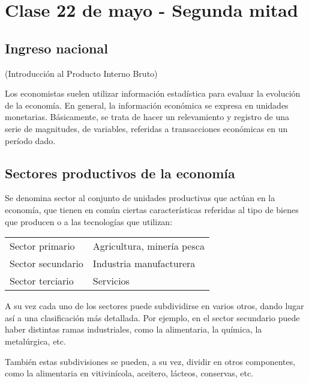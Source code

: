 \section{Clase 22 de mayo - Segunda mitad}

\subsection{Ingreso nacional}

(Introducción al Producto Interno Bruto)

Los economistas suelen utilizar información estadística
para evaluar la evolución de la economía.
En general, la información económica se expresa en unidades monetarias.
Básicamente,
se trata de hacer un relevamiento y registro de una serie de magnitudes,
de variables,
referidas a transacciones económicas en un período dado.

\subsection{Sectores productivos de la economía}

Se denomina sector al conjunto de unidades productivas que actúan en la economía,
que tienen en común ciertas características referidas al tipo de bienes que producen
o a las tecnologías que utilizan:

\vspace{.5cm}
\begin{table}[H]
    \centering
    \begin{tabular}{ll}
        \hline
        Sector primario   & Agricultura, minería pesca \\
        Sector secundario & Industria manufacturera    \\
        Sector terciario  & Servicios                  \\
        \hline
    \end{tabular}
\end{table}
\vspace{.5cm}

A su vez cada uno de los sectores puede subdividirse en varios otros,
dando lugar así a una clasificación más detallada.
Por ejemplo,
en el sector secundario puede haber distintas ramas industriales,
como la alimentaria, la química,
la metalúrgica,
etc.

También estas subdivisiones se pueden,
a su vez,
dividir en otros componentes,
como la alimentaria en vitivinícola,
aceitero,
lácteos,
conservas,
etc.

